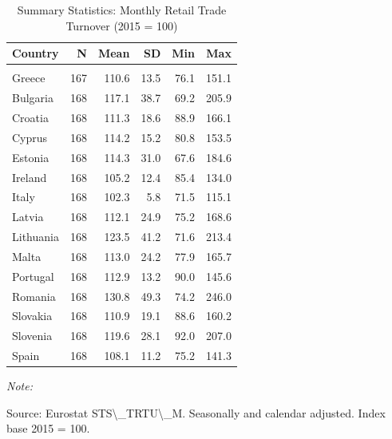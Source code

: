 \begin{table}[!h]
\centering
\caption{\label{tab:tab1}Summary Statistics: Monthly Retail Trade Turnover (2015 = 100)}
\centering
\begin{threeparttable}
\begin{tabular}[t]{lrrrrr}
\toprule
Country & N & Mean & SD & Min & Max\\
\midrule
\addlinespace[0.3em]
\multicolumn{6}{l}{\textbf{Panel A: Country-Level (G47 Total Retail)}}\\
\hspace{1em}Greece & 167 & 110.6 & 13.5 & 76.1 & 151.1\\
\hspace{1em}Bulgaria & 168 & 117.1 & 38.7 & 69.2 & 205.9\\
\hspace{1em}Croatia & 168 & 111.3 & 18.6 & 88.9 & 166.1\\
\hspace{1em}Cyprus & 168 & 114.2 & 15.2 & 80.8 & 153.5\\
\hspace{1em}Estonia & 168 & 114.3 & 31.0 & 67.6 & 184.6\\
\hspace{1em}Ireland & 168 & 105.2 & 12.4 & 85.4 & 134.0\\
\hspace{1em}Italy & 168 & 102.3 & 5.8 & 71.5 & 115.1\\
\hspace{1em}Latvia & 168 & 112.1 & 24.9 & 75.2 & 168.6\\
\hspace{1em}Lithuania & 168 & 123.5 & 41.2 & 71.6 & 213.4\\
\hspace{1em}Malta & 168 & 113.0 & 24.2 & 77.9 & 165.7\\
\hspace{1em}Portugal & 168 & 112.9 & 13.2 & 90.0 & 145.6\\
\hspace{1em}Romania & 168 & 130.8 & 49.3 & 74.2 & 246.0\\
\hspace{1em}Slovakia & 168 & 110.9 & 19.1 & 88.6 & 160.2\\
\hspace{1em}Slovenia & 168 & 119.6 & 28.1 & 92.0 & 207.0\\
\hspace{1em}Spain & 168 & 108.1 & 11.2 & 75.2 & 141.3\\
\bottomrule
\end{tabular}
\begin{tablenotes}
\item \textit{Note: } 
\item Source: Eurostat STS\textbackslash{}\_TRTU\textbackslash{}\_M. Seasonally and calendar adjusted. Index base 2015 = 100.
\end{tablenotes}
\end{threeparttable}
\end{table}
